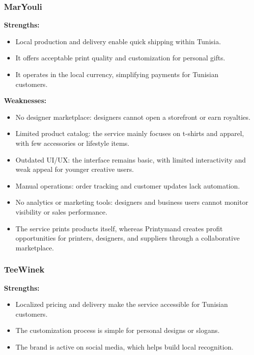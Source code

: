 \subsubsection{MarYouli}
\textbf{Strengths:}
\begin{itemize}
    \item Local production and delivery enable quick shipping within Tunisia.
    \item It offers acceptable print quality and customization for personal gifts.
    \item It operates in the local currency, simplifying payments for Tunisian customers.
\end{itemize}

\textbf{Weaknesses:}
\begin{itemize}
    \item No designer marketplace: designers cannot open a storefront or earn royalties.
    \item Limited product catalog: the service mainly focuses on t-shirts and apparel, with few accessories or lifestyle items.
    \item Outdated UI/UX: the interface remains basic, with limited interactivity and weak appeal for younger creative users.
    \item Manual operations: order tracking and customer updates lack automation.
    \item No analytics or marketing tools: designers and business users cannot monitor visibility or sales performance.
    \item The service prints products itself, whereas Printymand creates profit opportunities for printers, designers, and suppliers through a collaborative marketplace.
\end{itemize}

\subsubsection{TeeWinek}
\textbf{Strengths:}
\begin{itemize}
    \item Localized pricing and delivery make the service accessible for Tunisian customers.
    \item The customization process is simple for personal designs or slogans.
    \item The brand is active on social media, which helps build local recognition.
\end{itemize}

